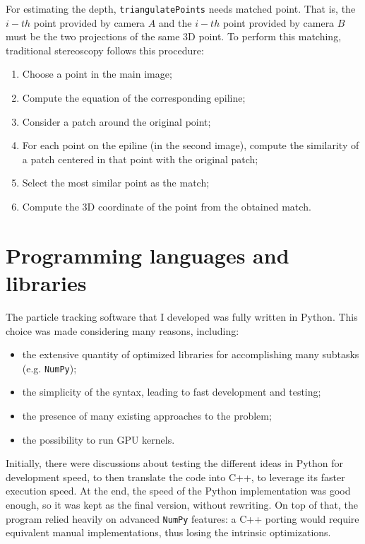 For estimating the depth, \texttt{triangulatePoints} needs matched point.
That is, the $i{-}th$ point provided by camera $A$ and the $i{-}th$ point provided by camera $B$ must be the two projections of the same 3D point.
To perform this matching, traditional stereoscopy follows this procedure:
\begin{enumerate}
	\itemsep 0em
	\item Choose a point in the main image;
	\item Compute the equation of the corresponding epiline;
	\item Consider a patch around the original point;
	\item For each point on the epiline (in the second image), compute the similarity of a patch centered in that point with the original patch;
	\item Select the most similar point as the match;
	\item Compute the 3D coordinate of the point from the obtained match.
\end{enumerate}

\section{Programming languages and libraries}

The particle tracking software that I developed was fully written in Python.
This choice was made considering many reasons, including:
\begin{itemize}
	\itemsep 0em
	\item the extensive quantity of optimized libraries for accomplishing many subtasks (e.g. \texttt{NumPy});
	\item the simplicity of the syntax, leading to fast development and testing;
	\item the presence of many existing approaches to the problem;
	\item the possibility to run GPU kernels.
\end{itemize}
Initially, there were discussions about testing the different ideas in Python for development speed, to then translate the code into C++, to leverage its faster execution speed.
At the end, the speed of the Python implementation was good enough, so it was kept as the final version, without rewriting.
On top of that, the program relied heavily on advanced \texttt{NumPy} features: a C++ porting would require equivalent manual implementations, thus losing the intrinsic optimizations.

